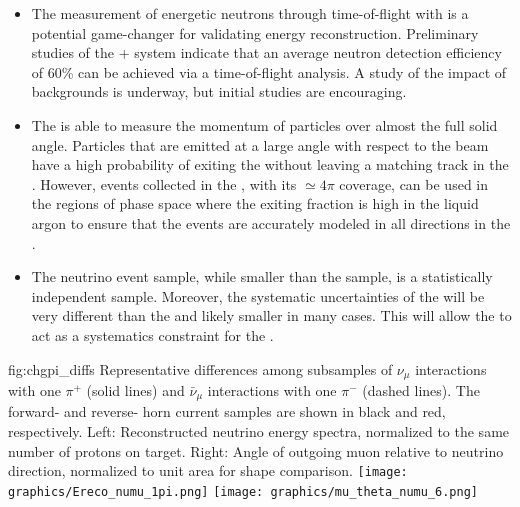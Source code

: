 \begin{itemize}
    \item The measurement of energetic neutrons through time-of-flight with  is a potential game-changer for validating energy reconstruction. Preliminary studies of the + system indicate that an average neutron detection efficiency of 60\% can be achieved via a time-of-flight analysis. A study of the impact of backgrounds is underway, but initial studies are encouraging.

    \item{The  is able to measure the momentum of particles over almost the full solid angle.  Particles that are emitted at a large angle with respect to the beam have a high probability of exiting the  without leaving a matching track in the . However, events collected in the , with its $\simeq 4\pi$ coverage, can be used in the regions of phase space where the exiting fraction is high in the liquid argon to ensure that the events are accurately modeled in all directions in the . }
    
    \item{The  neutrino event sample, while smaller than the  sample, is a statistically independent sample. Moreover, the systematic uncertainties of the  will be very different than the  and likely smaller in many cases. This will allow the  to act as a systematics constraint for the .
    }
\end{itemize}

\begin{dunefigure}{fig:chgpi_diffs}
{Representative differences among subsamples of  $\nu_{\mu}$ interactions with one $\pi^+$ (solid lines) and  $\bar{\nu}_{\mu}$ interactions with one $\pi^-$ (dashed lines). The forward- and reverse- horn current samples are shown in black and red, respectively. Left: Reconstructed neutrino energy spectra, normalized to the same number of protons on target. Right: Angle of outgoing muon relative to neutrino direction, normalized to unit area for shape comparison.}
    \texttt{[image: graphics/Ereco\_numu\_1pi.png]}
    \texttt{[image: graphics/mu\_theta\_numu\_6.png]}
\end{dunefigure}

